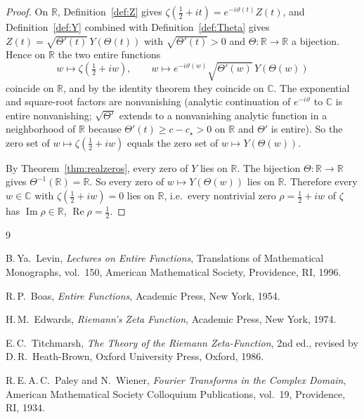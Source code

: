 \documentclass[11pt,a4paper]{article}
\theoremstyle{plain}
\theoremstyle{definition}
\newcommand{\R}{\mathbb{R}}
\newcommand{\C}{\mathbb{C}}
\DeclareMathOperator{\Real}{Re}
\DeclareMathOperator{\Imag}{Im}
\begin{document}
\begin{proof}
On $\R$, Definition~\ref{def:Z} gives $\zeta(\tfrac12+it)=e^{-i\vartheta(t)}Z(t)$, and Definition~\ref{def:Y} combined with Definition~\ref{def:Theta} gives $Z(t)=\sqrt{\Theta'(t)}\,Y(\Theta(t))$ with $\sqrt{\Theta'(t)}>0$ and $\Theta:\R\to\R$ a bijection. Hence on $\R$ the two entire functions
\[
w\mapsto\zeta(\tfrac12+iw),\qquad w\mapsto e^{-i\vartheta(w)}\sqrt{\Theta'(w)}\,Y(\Theta(w))
\]
coincide on $\R$, and by the identity theorem they coincide on $\C$. The exponential and square-root factors are nonvanishing (analytic continuation of $e^{-i\vartheta}$ to $\C$ is entire nonvanishing; $\sqrt{\Theta'}$ extends to a nonvanishing analytic function in a neighborhood of $\R$ because $\Theta'(t)\ge c-c_\star>0$ on $\R$ and $\Theta'$ is entire). So the zero set of $w\mapsto\zeta(\tfrac12+iw)$ equals the zero set of $w\mapsto Y(\Theta(w))$.

By Theorem~\ref{thm:realzeros}, every zero of $Y$ lies on $\R$. The bijection $\Theta:\R\to\R$ gives $\Theta^{-1}(\R)=\R$. So every zero of $w\mapsto Y(\Theta(w))$ lies on $\R$. Therefore every $w\in\C$ with $\zeta(\tfrac12+iw)=0$ lies on $\R$, i.e.\ every nontrivial zero $\rho=\tfrac12+iw$ of $\zeta$ has $\Imag\rho\in\R$, $\Real\rho=\tfrac12$.
\end{proof}

\begin{thebibliography}{9}

B.\,Ya.~Levin, \emph{Lectures on Entire Functions}, Translations of Mathematical Monographs, vol.~150, American Mathematical Society, Providence, RI, 1996.

R.\,P.~Boas, \emph{Entire Functions}, Academic Press, New York, 1954.

H.\,M.~Edwards, \emph{Riemann's Zeta Function}, Academic Press, New York, 1974.

E.\,C.~Titchmarsh, \emph{The Theory of the Riemann Zeta-Function}, 2nd ed., revised by D.\,R.~Heath-Brown, Oxford University Press, Oxford, 1986.

R.\,E.\,A.\,C.~Paley and N.~Wiener, \emph{Fourier Transforms in the Complex Domain}, American Mathematical Society Colloquium Publications, vol.~19, Providence, RI, 1934.

\end{thebibliography}
\end{document}
